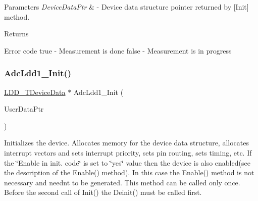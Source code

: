 \begin{DoxyParams}{Parameters}
{\em Device\+Data\+Ptr} & -\/ Device data structure pointer returned by \mbox{[}Init\mbox{]} method. \\
\hline
\end{DoxyParams}
\begin{DoxyReturn}{Returns}

\begin{DoxyItemize}
\item Error code true -\/ Measurement is done false -\/ Measurement is in progress 
\end{DoxyItemize}
\end{DoxyReturn}
\mbox{\label{group___adc_ldd1__module_gafdc37e93f468b5be237479085546273f}} 
\subsubsection{\texorpdfstring{Adc\+Ldd1\+\_\+\+Init()}{AdcLdd1\_Init()}}
{\footnotesize\ttfamily \hyperlink{group___p_e___types__module_gac5cf1362f1f0e3a2ce71b1bf2276d091}{L\+D\+D\+\_\+\+T\+Device\+Data} $\ast$ Adc\+Ldd1\+\_\+\+Init (\begin{DoxyParamCaption}\item[{\hyperlink{group___p_e___types__module_ga0b66a73f87238a782318aa0be7578e35}{L\+D\+D\+\_\+\+T\+User\+Data} $\ast$}]{User\+Data\+Ptr }\end{DoxyParamCaption})}



Initializes the device. Allocates memory for the device data structure, allocates interrupt vectors and sets interrupt priority, sets pin routing, sets timing, etc. If the \char`\"{}\+Enable in init. code\char`\"{} is set to \char`\"{}yes\char`\"{} value then the device is also enabled(see the description of the Enable() method). In this case the Enable() method is not necessary and needn\textquotesingle{}t to be generated. This method can be called only once. Before the second call of Init() the Deinit() must be called first. 


